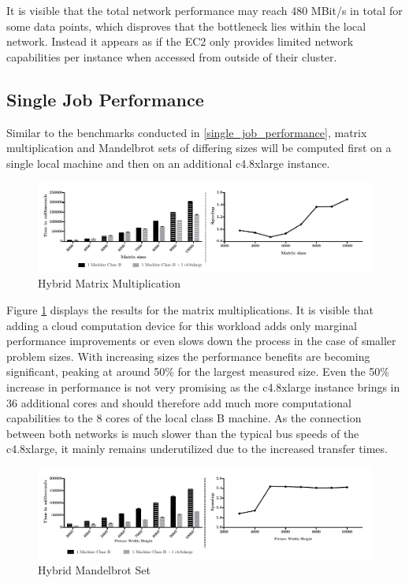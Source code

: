 It is visible that the total network performance may reach 480 MBit/s in total for some data points, which disproves that the bottleneck lies within the local network. Instead it appears as if the EC2 only provides limited network capabilities per instance when accessed from outside of their cluster.

\subsection{Single Job Performance}

Similar to the benchmarks conducted in \ref{single_job_performance}, matrix multiplication and Mandelbrot sets of differing sizes will be computed first on a single local machine and then on an additional c4.8xlarge instance.

\begin{figure}[H]
	\includegraphics[width=1.0\textwidth]{images/hybrid_matrix_multiplication.pdf}
	\centering
	\caption{Hybrid Matrix Multiplication}
	\label{img:hybrid_matrix_multiplication}
\end{figure}

Figure \ref{img:hybrid_matrix_multiplication} displays the results for the matrix multiplications. It is visible that adding a cloud computation device for this workload adds only marginal performance improvements or even slows down the process in the case of smaller problem sizes. With increasing sizes the performance benefits are becoming significant, peaking at around 50\% for the largest measured size. Even the 50\% increase in performance is not very promising as the c4.8xlarge instance brings in 36 additional cores and should therefore add much more computational capabilities to the 8 cores of the local class B machine. As the connection between both networks is much slower than the typical bus speeds of the c4.8xlarge, it mainly remains underutilized due to the increased transfer times.


\begin{figure}[H]	
	\includegraphics[width=1.0\textwidth]{images/hybrid_mandelbrot_performance.pdf}
	\centering
	\caption{Hybrid Mandelbrot Set}
	\label{img:hybrid_mandelbrot}
\end{figure}


